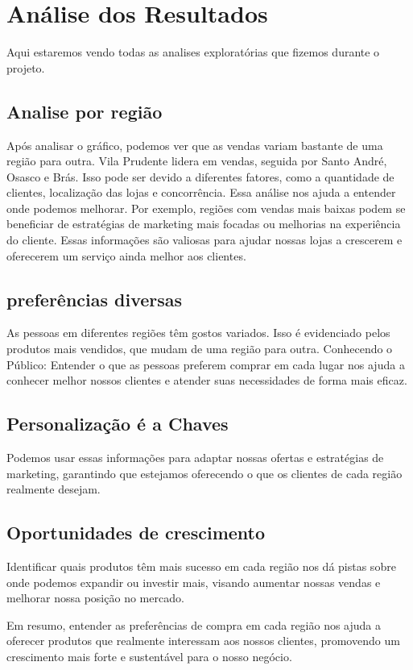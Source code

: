     \chapter{Análise dos Resultados}
\label{ch:resultados}
Aqui estaremos vendo todas as analises exploratórias que fizemos durante o projeto.

\section{Analise por região}
Após analisar o gráfico, podemos ver que as vendas variam bastante de uma região para outra. Vila Prudente lidera em vendas, seguida por Santo André, Osasco e Brás. Isso pode ser devido a diferentes fatores, como a quantidade de clientes, localização das lojas e concorrência.
Essa análise nos ajuda a entender onde podemos melhorar. Por exemplo, regiões com vendas mais baixas podem se beneficiar de estratégias de marketing mais focadas ou melhorias na experiência do cliente. Essas informações são valiosas para ajudar nossas lojas a crescerem e oferecerem um serviço ainda melhor aos clientes.

\section{preferências diversas}
As pessoas em diferentes regiões têm gostos variados. Isso é evidenciado pelos produtos mais vendidos, que mudam de uma região para outra. Conhecendo o Público: Entender o que as pessoas preferem comprar em cada lugar nos ajuda a conhecer melhor nossos clientes e atender suas necessidades de forma mais eficaz.

\section{Personalização é a Chaves}
Podemos usar essas informações para adaptar nossas ofertas e estratégias de marketing, garantindo que estejamos oferecendo o que os clientes de cada região realmente desejam.

\section{Oportunidades de crescimento}
Identificar quais produtos têm mais sucesso em cada região nos dá pistas sobre onde podemos expandir ou investir mais, visando aumentar nossas vendas e melhorar nossa posição no mercado.

Em resumo, entender as preferências de compra em cada região nos ajuda a oferecer produtos que realmente interessam aos nossos clientes, promovendo um crescimento mais forte e sustentável para o nosso negócio.

